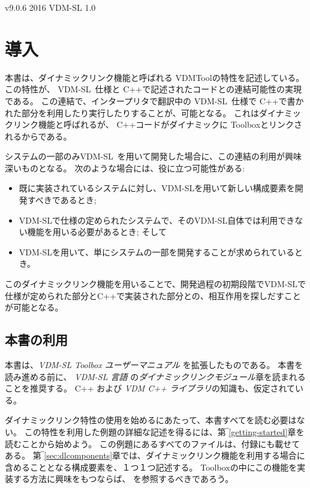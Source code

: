 \documentclass[\pformat,12pt]{jarticle}
\newcommand{\vdmslpp}{VDM-SL}
\begin{document}
       {v9.0.6}
       {2016}
       {VDM-SL}
       {1.0}


\section{導入}

本書は、ダイナミックリンク機能と呼ばれる VDMToolの特性を記述している。
この特性が、 \vdmslpp\ 仕様と C++で記述されたコードとの連結可能性の実現である。
この連結で、インタープリタで翻訳中の \vdmslpp\ 仕様で C++で書かれた部分を利用したり実行したりすることが、可能となる。 
これはダイナミックリンク機能と呼ばれるが、 C++コードがダイナミックに Toolboxとリンクされるからである。

システムの一部のみ\vdmslpp\ を用いて開発した場合に、この連結の利用が興味深いものとなる。
次のような場合には、役に立つ可能性がある:

\begin{itemize}
\item 既に実装されているシステムに対し、VDM-SLを用いて新しい構成要素を開発すべきであるとき;
\item VDM-SLで仕様の定められたシステムで、そのVDM-SL自体では利用できない機能を用いる必要があるとき; そして
\item VDM-SLを用いて、単にシステムの一部を開発することが求められているとき。
\end{itemize}

このダイナミックリンク機能を用いることで、開発過程の初期段階でVDM-SLで仕様が定められた部分とC++で実装された部分との、相互作用を探しだすことが可能となる。


\subsection{本書の利用}

本書は、{\it VDM-SL Toolbox ユーザーマニュアル} \cite{UserMan-CSK}を拡張したものである。
本書を読み進める前に、  {\it VDM-SL 言語} \cite{LangMan-CSK}の{\it ダイナミックリンクモジュール}章を読まれることを推奨する。
C++ \cite{Stroustrup91} および {\it VDM C++ ライブラリ}\cite{LibMan-CSK}の知識も、仮定されている。

ダイナミックリンク特性の使用を始めるにあたって、本書すべてを読む必要はない。
この特性を利用した例題の詳細な記述を得るには、第‾\ref{getting-started}章を
読むことから始めよう。
この例題にあるすべてのファイルは、付録にも載せてある。
第‾\ref{sec:dlcomponents}章では、ダイナミックリンク機能を利用する場合に含めることとなる構成要素を、１つ１つ記述する。
Toolboxの中にこの機能を実装する方法に興味をもつならば、 \cite{Frohlich&96}を参照するべきであろう。
\end{document}
